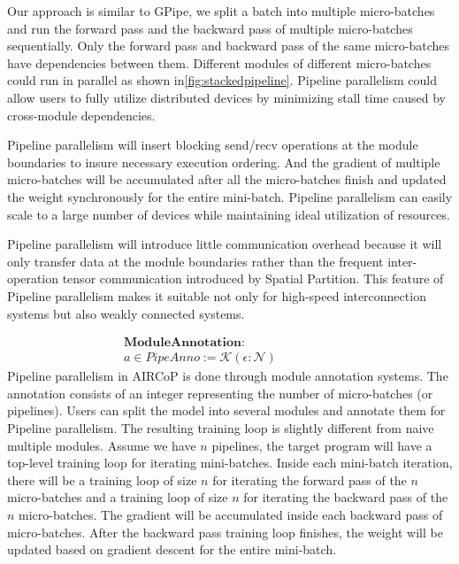 \documentclass[sigplan]{acmart}\settopmatter{printfolios=true,printccs=false,printacmref=false}
\begin{document}
 Our approach is similar to GPipe\cite{huang2019gpipe}, we split a batch into multiple micro-batches and run the forward pass and the backward pass of multiple micro-batches sequentially. Only the forward pass and backward pass of the same micro-batches have dependencies between them. Different modules of different micro-batches could run in parallel as shown in\ref{fig:stackedpipeline}. Pipeline parallelism could allow users to fully utilize distributed devices by minimizing stall time caused by cross-module dependencies. \par
 Pipeline parallelism will insert blocking send/recv operations at the module boundaries to insure necessary execution ordering. And the gradient of multiple micro-batches will be accumulated after all the micro-batches finish and updated the weight synchronously for the entire mini-batch. Pipeline parallelism can easily scale to a large number of devices while maintaining ideal utilization of resources.\par
 Pipeline parallelism will introduce little communication overhead because it will only transfer data at the module boundaries rather than the frequent inter-operation tensor communication introduced by Spatial Partition. This feature of Pipeline parallelism makes it suitable not only for high-speed interconnection systems but also weakly connected systems. \par
 \begin{align*}
  \textbf{ModuleAnnotation}: \qquad \qquad& \\
  a \in PipeAnno  := \mathcal{K} (\epsilon : \mathcal{N})\qquad \qquad&
\end{align*}
 Pipeline parallelism in AIRCoP is done through module annotation systems. The annotation consists of an integer representing the number of micro-batches (or pipelines). Users can split the model into several modules and annotate them for Pipeline parallelism. The resulting training loop is slightly different from naive multiple modules. Assume we have $n$ pipelines, the target program will have a top-level training loop for iterating mini-batches. Inside each mini-batch iteration, there will be a training loop of size $n$ for iterating the forward pass of the $n$ micro-batches and a training loop of size $n$ for iterating the backward pass of the $n$ micro-batches. The gradient will be accumulated inside each backward pass of micro-batches. After the backward pass training loop finishes, the weight will be updated based on gradient descent for the entire mini-batch.
\end{document}
